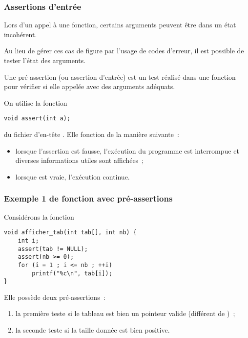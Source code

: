 \begin{frame}[fragile] \frametitle{Assertions d'entrée}
Lors d'un appel à une fonction, certains arguments peuvent être dans un 
état incohérent.
\medskip

Au lieu de gérer ces cas de figure par l'usage de codes d'erreur, il est
possible de tester l'état des arguments.
\medskip

Une \alert{pré-assertion} (ou assertion d'entrée) est un test réalisé 
dans une fonction pour vérifier si elle appelée avec des arguments 
adéquats.
\bigskip

On utilise la fonction 
\begin{lstlisting}
void assert(int a);
\end{lstlisting} 
du fichier d’en-tête . Elle fonction de la manière 
suivante~:

\begin{itemize}
    \item lorsque l'assertion  est fausse, l’exécution du 
    programme est interrompue et diverses informations utiles sont 
    affichées~;
    \smallskip
    
    \item lorsque  est vraie, l'exécution continue.
\end{itemize}
\end{frame}

\begin{frame}[fragile] 
    \frametitle{Exemple 1 de fonction avec pré-assertions}
Considérons la fonction
\begin{lstlisting}
void afficher_tab(int tab[], int nb) {
    int i;
    assert(tab != NULL);
    assert(nb >= 0);
    for (i = 1 ; i <= nb ; ++i)
        printf("%c\n", tab[i]);
}
\end{lstlisting}

Elle possède deux pré-assertions~:

\begin{enumerate}
    \item la première teste si le tableau  est bien un pointeur
    valide (différent de )~;
    \smallskip
    
    \item la seconde teste si la taille  donnée est bien 
    positive.
\end{enumerate}
\end{frame}

